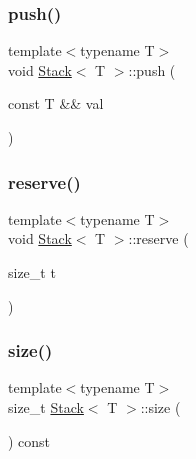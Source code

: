 \subsubsection{\texorpdfstring{push()}{push()}\hspace{0.1cm}{\footnotesize\ttfamily [2/2]}}
{\footnotesize\ttfamily template$<$typename T$>$ \\
void \hyperlink{class_stack}{Stack}$<$ T $>$\+::push (\begin{DoxyParamCaption}\item[{const T \&\&}]{val }\end{DoxyParamCaption})\hspace{0.3cm}{\ttfamily [inline]}}

\mbox{\label{class_stack_a112b1dda8f0187bd63c4cd0cb877bd92}} 
\subsubsection{\texorpdfstring{reserve()}{reserve()}}
{\footnotesize\ttfamily template$<$typename T$>$ \\
void \hyperlink{class_stack}{Stack}$<$ T $>$\+::reserve (\begin{DoxyParamCaption}\item[{size\+\_\+t}]{t }\end{DoxyParamCaption})\hspace{0.3cm}{\ttfamily [inline]}}

\mbox{\label{class_stack_aa34222dbc28544189d97add837498b71}} 
\subsubsection{\texorpdfstring{size()}{size()}}
{\footnotesize\ttfamily template$<$typename T$>$ \\
size\+\_\+t \hyperlink{class_stack}{Stack}$<$ T $>$\+::size (\begin{DoxyParamCaption}{ }\end{DoxyParamCaption}) const\hspace{0.3cm}{\ttfamily [inline]}}

\mbox{\label{class_stack_ad461f6de40c8672dbf743068f4515061}} 

